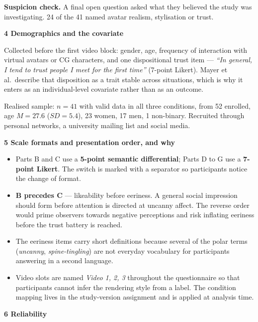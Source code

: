 \documentclass[10pt,a4paper]{article}
\newcommand{\sect}[1]{%
  \needspace{4\baselineskip}\vspace{0.7em}
  \noindent\colorbox{knblue}{\parbox{0.978\textwidth}{\vspace{1pt}\color{white}\textbf{#1}\vspace{1pt}}}
  \vspace{0.3em}\par}
\newcommand{\key}[1]{{\color{knblue}\textbf{#1}}}
\begin{document}
\textbf{Suspicion check.} A final open question asked what they believed the study was investigating. 24 of the 41 named avatar realism, stylisation or trust.

\sect{4 \quad Demographics and the covariate}

Collected before the first video block: gender, age, frequency of interaction with virtual avatars or CG characters, and one dispositional trust item — \emph{``In general, I tend to trust people I meet for the first time''} (7-point Likert). Mayer et al.\ describe that disposition as a trait stable across situations, which is why it enters as an individual-level covariate rather than as an outcome.

Realised sample: \key{$n = 41$} with valid data in all three conditions, from 52 enrolled, age $M = 27.6$ ($SD = 5.4$), 23 women, 17 men, 1 non-binary. Recruited through personal networks, a university mailing list and social media.

\sect{5 \quad Scale formats and presentation order, and why}

\begin{itemize}[leftmargin=1.2em,itemsep=0.15em]
  \item Parts B and C use a \key{5-point semantic differential}; Parts D to G use a \key{7-point Likert}. The switch is marked with a separator so participants notice the change of format.
  \item \key{B precedes C} — likeability before eeriness. A general social impression should form before attention is directed at uncanny affect. The reverse order would prime observers towards negative perceptions and risk inflating eeriness before the trust battery is reached.
  \item The eeriness items carry short definitions because several of the polar terms (\emph{uncanny}, \emph{spine-tingling}) are not everyday vocabulary for participants answering in a second language.
  \item Video slots are named \emph{Video 1, 2, 3} throughout the questionnaire so that participants cannot infer the rendering style from a label. The condition mapping lives in the study-version assignment and is applied at analysis time.
\end{itemize}

\sect{6 \quad Reliability}
\end{document}
